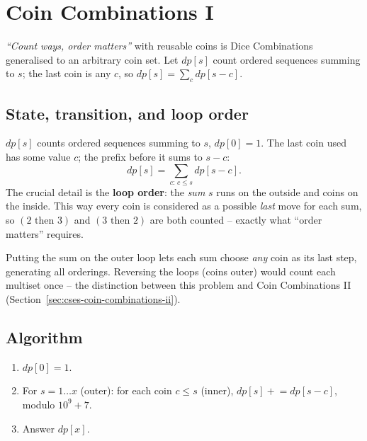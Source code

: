 \section{Coin Combinations I}
\label{sec:cses-coin-combinations-i}


\begin{patternbox}
\emph{``Count ways, order matters''} with reusable coins is Dice
Combinations generalised to an arbitrary coin set. Let $\textit{dp}[s]$
count ordered sequences summing to $s$; the last coin is any $c$, so
$\textit{dp}[s]=\sum_c \textit{dp}[s-c]$.
\end{patternbox}

\subsection*{State, transition, and loop order}

$\textit{dp}[s]$ counts ordered sequences summing to $s$,
$\textit{dp}[0]=1$. The last coin used has some value $c$; the prefix
before it sums to $s-c$:
\[
  \textit{dp}[s]=\sum_{c:\,c\le s}\textit{dp}[s-c].
\]
The crucial detail is the \textbf{loop order}: the \emph{sum} $s$ runs on
the outside and coins on the inside. This way every coin is considered as
a possible \emph{last} move for each sum, so $(2\text{ then }3)$ and
$(3\text{ then }2)$ are both counted -- exactly what ``order matters''
requires.

\begin{ideabox}
Putting the sum on the outer loop lets each sum choose \emph{any} coin as
its last step, generating all orderings. Reversing the loops (coins
outer) would count each multiset once -- the distinction between this
problem and Coin Combinations II (Section~\ref{sec:cses-coin-combinations-ii}).
\end{ideabox}

\subsection*{Algorithm}

\begin{enumerate}
  \item $\textit{dp}[0]=1$.
  \item For $s=1\ldots x$ (outer): for each coin $c\le s$ (inner),
        $\textit{dp}[s]\mathrel{+}=\textit{dp}[s-c]$, modulo $10^9+7$.
  \item Answer $\textit{dp}[x]$.
\end{enumerate}


